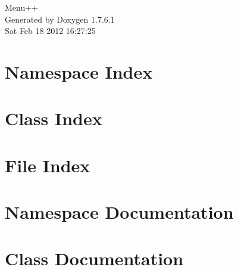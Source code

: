 \documentclass[a4paper]{book}
\begin{document}
\hypersetup{pageanchor=false,citecolor=blue}
\begin{titlepage}
\vspace*{7cm}
\begin{center}
{\Large \-Menu++ }\\
\vspace*{1cm}
{\large \-Generated by Doxygen 1.7.6.1}\\
\vspace*{0.5cm}
{\small Sat Feb 18 2012 16:27:25}\\
\end{center}
\end{titlepage}
\clearemptydoublepage
{}
\tableofcontents
\clearemptydoublepage
{}
\hypersetup{pageanchor=true,citecolor=blue}
\chapter{\-Namespace \-Index}

\chapter{\-Class \-Index}

\chapter{\-File \-Index}

\chapter{\-Namespace \-Documentation}


\chapter{\-Class \-Documentation}



















\end{document}
